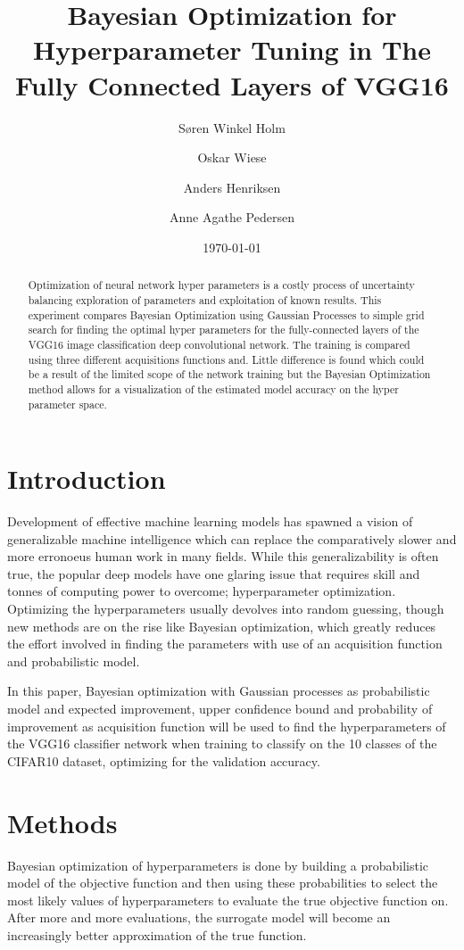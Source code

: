 \documentclass[12pt,fleqn]{article}
\title{Bayesian Optimization for Hyperparameter Tuning in The Fully Connected Layers of VGG16}
\author{Søren Winkel Holm\and Oskar Wiese\and Anders Henriksen\and Anne Agathe Pedersen}
\date{\today}
\begin{document}
\maketitle


\begin{abstract}
\noindent Optimization of neural network hyper parameters is a costly process of uncertainty balancing exploration of parameters and exploitation of known results. This experiment compares Bayesian Optimization using Gaussian Processes to  simple grid search for finding the optimal hyper parameters for the fully-connected layers of the VGG16 image classification deep convolutional network. The training is compared using three different acquisitions functions and. Little difference is found which could be a result of the limited scope of the network training but the Bayesian Optimization method allows for a visualization of the estimated model accuracy on the hyper parameter space.

\end{abstract}


\section{Introduction} 
Development of effective machine learning models has spawned a vision of generalizable machine intelligence which can replace the comparatively slower and more erronoeus human work in many fields. While this generalizability is often true, the popular deep models have one glaring issue that requires skill and tonnes of computing power to overcome; hyperparameter optimization. Optimizing the hyperparameters usually devolves into random guessing, though new methods are on the rise like Bayesian optimization, which greatly reduces the effort involved in finding the parameters with use of an acquisition function and probabilistic model.

In this paper, Bayesian optimization with Gaussian processes as probabilistic model and expected improvement, upper confidence bound and probability of improvement as acquisition function will be used to find the hyperparameters of the VGG16 classifier network when training to classify on the 10 classes of the CIFAR10 dataset, optimizing for the validation accuracy.


\section{Methods}
Bayesian optimization of hyperparameters is done by building a probabilistic model of the objective function and then using these probabilities to select the most likely values of hyperparameters to evaluate the true objective function on. After more and more evaluations, the surrogate model will become an increasingly better approximation of the true function. 
\end{document}
